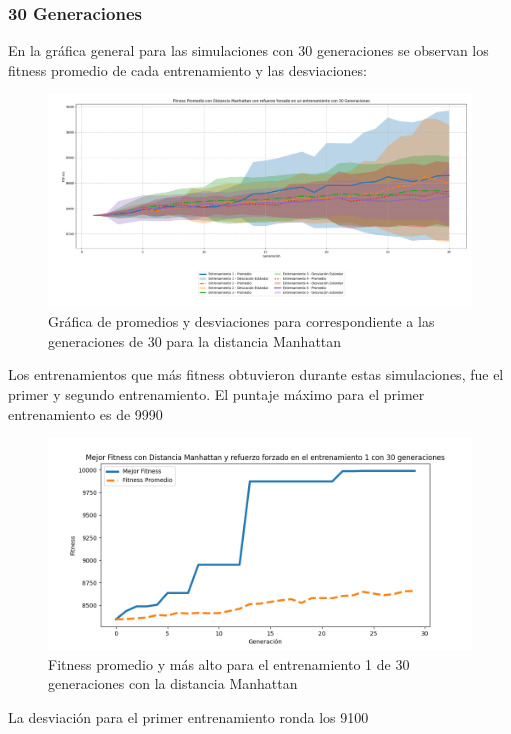 \documentclass[conference]{IEEEtran}
\begin{document}
\subsubsection{30 Generaciones}
En la gráfica general para las simulaciones con 30 generaciones se observan los fitness promedio de cada entrenamiento y las desviaciones:
\begin{figure}[H]
    \centering
    \includegraphics[width=1\linewidth]{Manhattan/Fitness_Acumulado_Manh30Gen.png}
    \caption{Gráfica de promedios y desviaciones para correspondiente a las generaciones de 30 para la distancia Manhattan}
    \label{fig:Manhattan_30_genral}
\end{figure}
Los entrenamientos que más fitness obtuvieron durante estas simulaciones, fue el primer y segundo entrenamiento. El puntaje máximo para el primer entrenamiento es de 9990
\begin{figure}[H]
    \centering
    \includegraphics[width=0.99\linewidth]{Manhattan/Fitness_Individual_30Gen/Fitness_1_Mahn_30Gen.png}
    \caption{Fitness promedio y más alto para el entrenamiento 1 de 30 generaciones con la distancia Manhattan}
    \label{fig:manhattan_30_fitness}
\end{figure}
La desviación para el primer entrenamiento ronda los 9100
\end{document}
